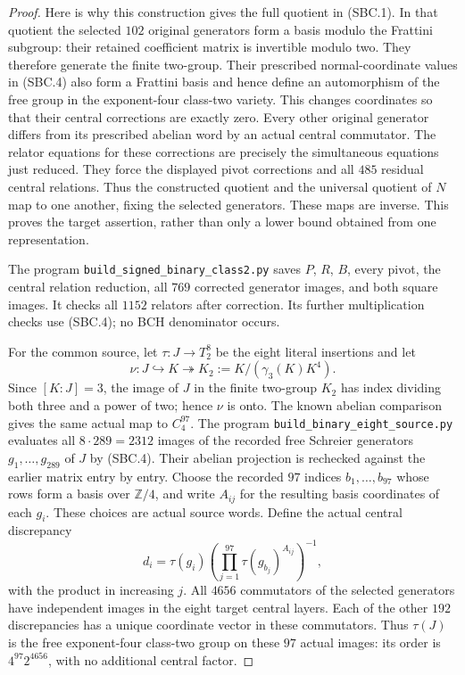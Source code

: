 \begin{proof}
Here is why this construction gives the full quotient in (SBC.1).
In that quotient the selected $102$ original generators form a basis
modulo the Frattini subgroup: their retained coefficient matrix is
invertible modulo two.  They therefore generate the finite two-group.
Their prescribed normal-coordinate values in (SBC.4) also form a
Frattini basis and hence define an automorphism of the free group
in the exponent-four class-two variety.  This changes coordinates
so that their central corrections are exactly zero.  Every other
original generator differs from its prescribed abelian word by an
actual central commutator.  The relator equations for these corrections
are precisely the simultaneous equations just reduced.  They force
the displayed pivot corrections and all $485$ residual central
relations.  Thus the constructed quotient and the universal quotient
of $N$ map to one another, fixing the selected generators.  These
maps are inverse.  This proves the target assertion, rather than
only a lower bound obtained from one representation.

The program \texttt{build\_signed\_binary\_class2.py} saves $P$, $R$,
$B$, every pivot, the central relation reduction, all $769$ corrected
generator images, and both square images.  It checks all $1152$
relators after correction.  Its further multiplication checks use
(SBC.4); no BCH denominator occurs.

For the common source, let $\tau:J\to T_2^8$ be the eight literal
insertions and let
\[
 \nu:J\hookrightarrow K\twoheadrightarrow
               K_2:=K/(\gamma_3(K)K^4).
\tag{SBC.7}
\]
Since $[K:J]=3$, the image of $J$ in the finite two-group $K_2$ has index dividing both three and a power of two; hence $\nu$ is onto.  The known abelian comparison gives the same actual map to $C_4^{97}$.
The program \texttt{build\_binary\_eight\_source.py} evaluates all
$8\cdot289=2312$ images of the recorded free Schreier generators
$g_1,\ldots,g_{289}$ of $J$ by (SBC.4).  Their abelian projection
is rechecked against the earlier matrix entry by entry.
Choose the recorded $97$ indices $b_1,\ldots,b_{97}$ whose rows form
a basis over $\mathbb Z/4$, and write $A_{ij}$ for the resulting
basis coordinates of each $g_i$.  These choices are actual source
words.  Define the actual central discrepancy
\[
 d_i=\tau(g_i)\left(\prod_{j=1}^{97}
                    \tau(g_{b_j})^{A_{ij}}\right)^{-1},
\tag{SBC.8}
\]
with the product in increasing $j$.
All $4656$ commutators of the selected generators have independent
images in the eight target central layers.  Each of the other
$192$ discrepancies has a unique coordinate vector in these
commutators.  Thus $\tau(J)$ is the free exponent-four class-two
group on these $97$ actual images: its order is $4^{97}2^{4656}$,
with no additional central factor.


\end{proof}
